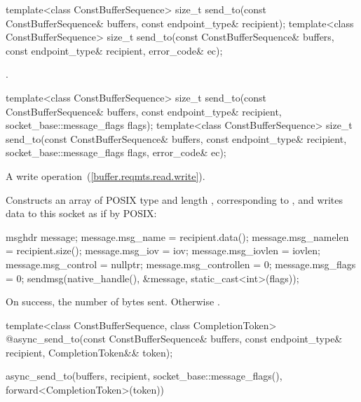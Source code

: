 \begin{itemdecl}
template<class ConstBufferSequence>
  size_t send_to(const ConstBufferSequence& buffers,
                 const endpoint_type& recipient);
template<class ConstBufferSequence>
  size_t send_to(const ConstBufferSequence& buffers,
                 const endpoint_type& recipient, error_code& ec);
\end{itemdecl}

\begin{itemdescr}
\pnum
\returns {}.
\end{itemdescr}

\begin{itemdecl}
template<class ConstBufferSequence>
  size_t send_to(const ConstBufferSequence& buffers,
                 const endpoint_type& recipient,
                 socket_base::message_flags flags);
template<class ConstBufferSequence>
  size_t send_to(const ConstBufferSequence& buffers,
                 const endpoint_type& recipient,
                 socket_base::message_flags flags, error_code& ec);
\end{itemdecl}

\begin{itemdescr}
\pnum
A write operation~(\ref{buffer.reqmts.read.write}).

\pnum
\effects Constructs an array  of POSIX type  and length , corresponding to , and writes data to this socket as if by POSIX:
\begin{codeblock}
msghdr message;
message.msg_name = recipient.data();
message.msg_namelen = recipient.size();
message.msg_iov = iov;
message.msg_iovlen = iovlen;
message.msg_control = nullptr;
message.msg_controllen = 0;
message.msg_flags = 0;
sendmsg(native_handle(), &message, static_cast<int>(flags));
\end{codeblock}


\pnum
\returns On success, the number of bytes sent. Otherwise .
\end{itemdescr}

\begin{itemdecl}
template<class ConstBufferSequence, class CompletionToken>
  @\DEDUCED@ async_send_to(const ConstBufferSequence& buffers,
                        const endpoint_type& recipient,
                        CompletionToken&& token);
\end{itemdecl}

\begin{itemdescr}
\pnum
\returns
\begin{codeblock}
async_send_to(buffers, recipient, socket_base::message_flags(),
              forward<CompletionToken>(token))
\end{codeblock}
\end{itemdescr}

